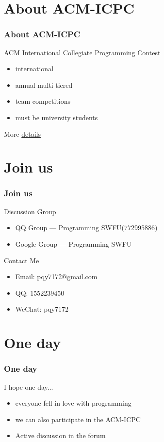 \documentclass{beamer}
\begin{document}
\section{About ACM-ICPC}
\begin{frame}
  \frametitle{About ACM-ICPC}
  \Large {ACM International Collegiate Programming Contest}
  \begin{itemize}
  \item international 
  \item annual multi-tiered
  \item team competitions
  \item must be university students
  \end{itemize}
  More \href{https://en.wikipedia.org/wiki/ACM_International_Collegiate_Programming_Contest}{details}
\end{frame}


\section{Join us}
\begin{frame}
  \frametitle{Join us}
  Discussion Group
  \begin{itemize}
  \item QQ Group --- Programming SWFU(772995886)
  \item Google Group --- Programming-SWFU
  \end{itemize}
  Contact Me
  \begin{itemize}
  \item Email: pqy7172@gmail.com
  \item QQ: 1552239450
  \item WeChat: pqy7172
  \end{itemize}
\end{frame}



\section{One day}
\begin{frame}
  \frametitle{One day}
  I hope one day...
\begin{itemize}
\item everyone fell in love with programming
\item we can also participate in the ACM-ICPC
\item Active discussion in the forum
  
\end{itemize}
\end{frame}
\end{document}
